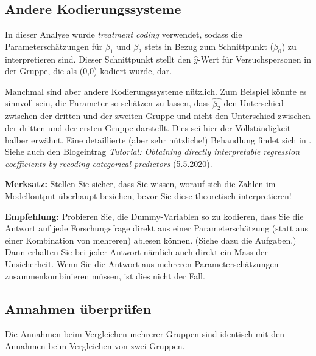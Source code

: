 \documentclass[oneside, 10pt]{book}\usepackage[]{graphicx}\usepackage[]{xcolor}
\begin{document}
\subsection{Andere Kodierungssysteme}\label{sec:kodierungssysteme}
In dieser Analyse wurde \textit{treatment coding} verwendet,
sodass die Parameterschätzungen für $\beta_1$ und $\beta_2$ stets in Bezug zum
Schnittpunkt ($\beta_0$) zu interpretieren sind. Dieser Schnittpunkt
stellt den $\widehat{y}$-Wert für Versuchspersonen in der Gruppe,
die als (0,0) kodiert wurde, dar.

Manchmal sind aber andere Kodierungssysteme nützlich. Zum Beispiel
könnte es sinnvoll sein, die Parameter so schätzen zu lassen, dass
$\widehat{\beta_2}$ den Unterschied zwischen der dritten und der zweiten Gruppe
und nicht den Unterschied zwischen der dritten und der ersten Gruppe
darstellt. Dies sei hier der Vollständigkeit halber erwähnt.
Eine detaillierte (aber sehr nützliche!) Behandlung findet sich in \citet{Schad2020}.
Siehe auch den Blogeintrag \href{https://janhove.github.io/analysis/2020/05/05/contrast-coding}{\textit{Tutorial: Obtaining directly interpretable regression coefficients by recoding categorical predictors}} (5.5.2020).

\medskip

\begin{framed}
\noindent \textbf{Merksatz:}
Stellen Sie sicher, dass Sie wissen, worauf sich die Zahlen im Modelloutput
überhaupt beziehen, bevor Sie diese theoretisch interpretieren!
\end{framed}

\medskip

\begin{framed}
\noindent \textbf{Empfehlung:} 
Probieren Sie, die Dummy-Variablen so zu kodieren, dass Sie die Antwort
auf jede Forschungsfrage direkt aus einer Parameterschätzung (statt aus einer
Kombination von mehreren) ablesen können. (Siehe dazu die Aufgaben.)
Dann erhalten Sie bei jeder Antwort nämlich auch direkt ein Mass der Unsicherheit.
Wenn Sie die Antwort aus mehreren Parameterschätzungen zusammenkombinieren müssen,
ist dies nicht der Fall.
\end{framed}

\subsection{Annahmen überprüfen}
Die Annahmen beim Vergleichen mehrerer Gruppen sind identisch
mit den Annahmen beim Vergleichen von zwei Gruppen.
\end{document}
